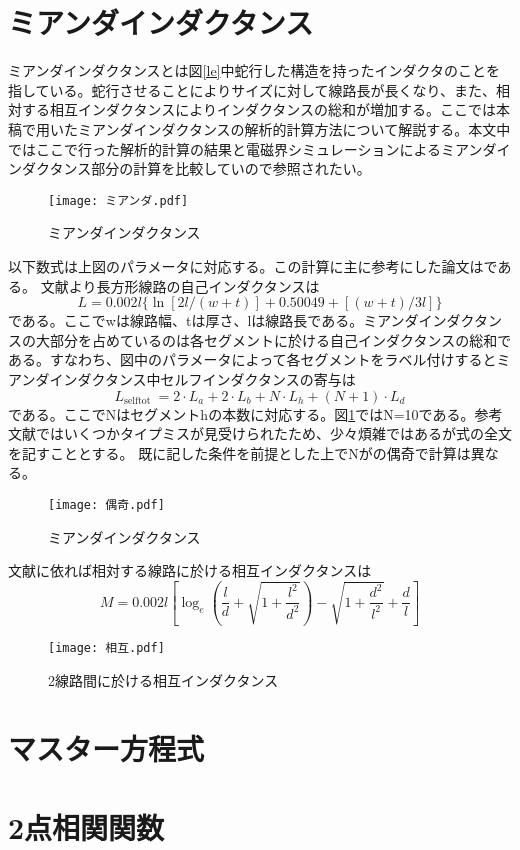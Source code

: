 \section{ミアンダインダクタンス}
ミアンダインダクタンスとは図\ref{le}中蛇行した構造を持ったインダクタのことを指している。蛇行させることによりサイズに対して線路長が長くなり、また、相対する相互インダクタンスによりインダクタンスの総和が増加する。ここでは本稿で用いたミアンダインダクタンスの解析的計算方法について解説する。本文中ではここで行った解析的計算の結果と電磁界シミュレーションによるミアンダインダクタンス部分の計算を比較していので参照されたい。
\begin{figure}[H]
    \label{ミアンダ}
    \centering
    \texttt{[image: ミアンダ.pdf]}
    \caption{ミアンダインダクタンス}
\end{figure}
以下数式は上図のパラメータに対応する。この計算に主に参考にした論文は\cite*{Stojanovic2004}である。
文献\cite*{Grover}より長方形線路の自己インダクタンスは
\begin{equation}
    L=0.002 l\{\ln [2 l /(w+t)]+0.50049+[(w+t) / 3 l]\}
\end{equation}
である。ここでwは線路幅、tは厚さ、lは線路長である。ミアンダインダクタンスの大部分を占めているのは各セグメントに於ける自己インダクタンスの総和である。すなわち、図中のパラメータによって各セグメントをラベル付けするとミアンダインダクタンス中セルフインダクタンスの寄与は
\begin{equation}
    L_{\text {selftot }}=2 \cdot L_{a}+2 \cdot L_{b}+N \cdot L_{h}+(N+1) \cdot L_{d}
\end{equation}
である。ここでNはセグメントhの本数に対応する。図\ref*{ミアンダ}ではN=10である。参考文献ではいくつかタイプミスが見受けられたため、少々煩雑ではあるが式の全文を記すこととする。
既に記した条件を前提とした上でNがの偶奇で計算は異なる。
\begin{figure}[H]
    \label{偶奇}
    \centering
    \texttt{[image: 偶奇.pdf]}
    \caption{ミアンダインダクタンス}
\end{figure}
文献\cite*{Grover}に依れば相対する線路に於ける相互インダクタンスは
\begin{equation}
    M=0.002 l\left[\log _{e}\left(\frac{l}{d}+\sqrt{1+\frac{l^{2}}{d^{2}}}\right)-\sqrt{1+\frac{d^{2}}{l^{2}}}+\frac{d}{l}\right]
\end{equation}
\begin{figure}[H]
    \label{相互}
    \centering
    \texttt{[image: 相互.pdf]}
    \caption{2線路間に於ける相互インダクタンス}
\end{figure}

\section{マスター方程式}
\section{2点相関関数}
